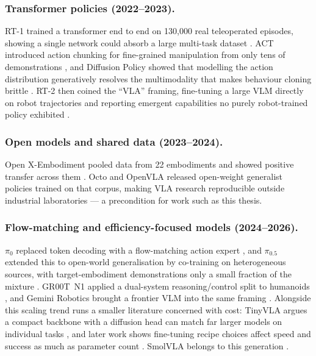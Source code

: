 \subsubsection{Transformer policies (2022--2023).} RT-1 trained a transformer end to
end on 130{,}000 real teleoperated episodes, showing a single network could absorb a
large multi-task dataset \parencite{brohan2023rt1}. ACT introduced action chunking for
fine-grained manipulation from only tens of demonstrations \parencite{zhao2023act}, and
Diffusion Policy showed that modelling the action distribution generatively resolves
the multimodality that makes behaviour cloning brittle
\parencite{chi2023diffusionpolicy}. RT-2 then coined the ``VLA'' framing, fine-tuning a
large VLM directly on robot trajectories and reporting emergent capabilities no purely
robot-trained policy exhibited \parencite{zitkovich2023rt2}.

\subsubsection{Open models and shared data (2023--2024).} Open X-Embodiment pooled data
from 22 embodiments and showed positive transfer across them
\parencite{padalkar2024openx}. Octo \parencite{ghosh2024octo} and OpenVLA
\parencite{kim2024openvla} released open-weight generalist policies trained on that
corpus, making VLA research reproducible outside industrial laboratories --- a
precondition for work such as this thesis.

\subsubsection{Flow-matching and efficiency-focused models (2024--2026).} $\pi_0$
replaced token decoding with a flow-matching action expert \parencite{black2024pi0},
and $\pi_{0.5}$ extended this to open-world generalisation by co-training on
heterogeneous sources, with target-embodiment demonstrations only a small fraction of
the mixture \parencite{black2025pi05}. GR00T~N1 applied a dual-system reasoning/control
split to humanoids \parencite{nvidia2025gr00t}, and Gemini Robotics brought a frontier
VLM into the same framing \parencite{deepmind2025gemini}. Alongside this scaling trend
runs a smaller literature concerned with cost: TinyVLA argues a compact backbone with a
diffusion head can match far larger models on individual tasks
\parencite{wen2025tinyvla}, and later work shows fine-tuning recipe choices affect speed
and success as much as parameter count \parencite{kim2025oft}. SmolVLA belongs to this
generation \parencite{shukor2025smolvla}.

